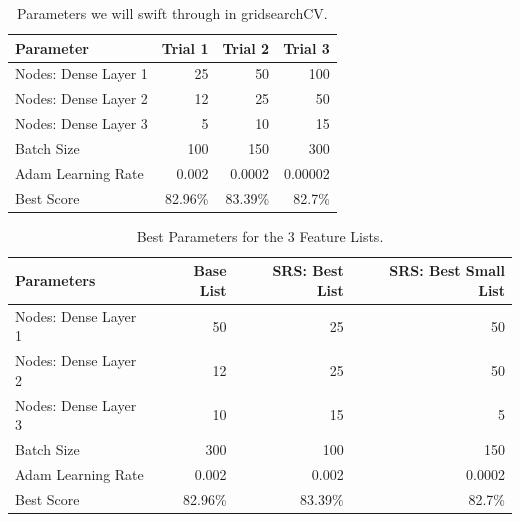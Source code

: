 \documentclass[]{article}
\begin{document}
\begin{table}[]
	\centering
	\begin{tabular}{@{}lrrr@{}}
		\toprule
		Parameter            & Trial 1 & Trial 2 & Trial 3 \\ \midrule
		Nodes: Dense Layer 1 & 25      & 50      & 100     \\
		Nodes: Dense Layer 2 & 12      & 25      & 50      \\
		Nodes: Dense Layer 3 & 5       & 10      & 15      \\
		Batch Size           & 100     & 150     & 300     \\
		Adam Learning Rate   & 0.002   & 0.0002  & 0.00002 \\
		Best Score           & 82.96\% & 83.39\% & 82.7\%\\
		\bottomrule   
	\end{tabular}
		\caption{Parameters we will swift through in gridsearchCV.} 
	\label{table:gridsearchCV_params}
\end{table}




\begin{table}[h!]
	\centering
	\begin{tabular}{@{}lrrr@{}}
		\toprule
		Parameters           & Base List & SRS: Best List & SRS: Best Small List \\ \midrule

		Nodes: Dense Layer 1 & 50        & 25             & 50                                                  \\
		Nodes: Dense Layer 2 & 12        & 25             & 50                                                  \\
		Nodes: Dense Layer 3 & 10        & 15             & 5                                                   \\
				Batch Size          & 300       & 100            & 150                                                 \\
		Adam Learning Rate   & 0.002     & 0.002          & 0.0002                                              \\
		Best Score           & 82.96\%   & 83.39\%        & 82.7\%  \\
		\bottomrule                                            
	\end{tabular}
	\caption{Best Parameters for the 3 Feature Lists.} 
	\label{table:best_params_gridsearchCV}
	
\end{table}
\end{document}
